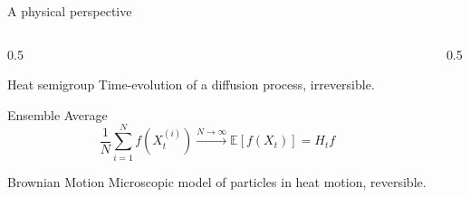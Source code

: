 \documentclass{if-beamer}
\begin{document}
\begin{frame}{A physical perspective}
    \begin{columns}
        \begin{column}{0.5\textwidth}
            \begin{block}{Heat semigroup}
                Time-evolution of a diffusion process, irreversible.
            \end{block}
            \vspace{1em}
            Ensemble Average
            \begin{equation*}
                \frac{1}{N} \sum_{i = 1}^N f(X^{(i)}_t) \xrightarrow{N \to \infty} \mathbb{E}[f(X_t)] = H_t f 
            \end{equation*}

            \vspace{1em}

            \begin{block}{Brownian Motion}
                Microscopic model of particles in heat motion, reversible.
            \end{block}
            
        \end{column}
        \begin{column}{0.5\textwidth}
            
            
        \end{column}
    \end{columns}
\end{frame}
\end{document}
